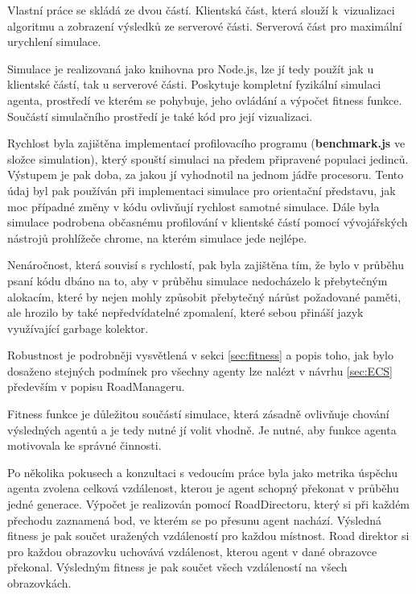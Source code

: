 



Vlastní práce se skládá ze dvou částí. Klientská část, která slouží k~vizualizaci algoritmu a zobrazení výsledků ze serverové části. Serverová část pro maximální urychlení simulace. 

Simulace je realizovaná jako knihovna pro Node.js, lze jí tedy použít jak u klientské částí, tak u serverové části. Poskytuje kompletní fyzikální simulaci agenta, prostředí ve kterém se pohybuje, jeho ovládání a výpočet fitness funkce. Součástí simulačního prostředí je také kód pro její vizualizaci.

Rychlost byla zajištěna implementací profilovacího programu (\textbf{benchmark.js} ve složce simulation), který spouští simulaci na předem připravené populaci jedinců. Výstupem je pak doba, za jakou jí vyhodnotil na jednom jádře procesoru. Tento údaj byl pak používán při implementaci simulace pro orientační představu, jak moc případné změny v kódu ovlivňují rychlost samotné simulace. Dále byla simulace podrobena občasnému profilování v klientské částí pomocí vývojářských nástrojů prohlížeče chrome, na kterém simulace jede nejlépe.

Nenáročnost, která souvisí s rychlostí, pak byla zajištěna tím, že bylo v průběhu psaní kódu dbáno na to, aby v průběhu simulace nedocházelo k přebytečným alokacím, které by nejen mohly způsobit přebytečný nárůst požadované paměti, ale hrozilo by také nepředvídatelné zpomalení, které sebou přináší jazyk využívající garbage kolektor.

Robustnost je podrobněji vysvětlená v sekci \ref{sec:fitness} a popis toho, jak bylo dosaženo stejných podmínek pro všechny agenty lze nalézt v návrhu \ref{sec:ECS} především v popisu RoadManageru.

\label{sec:fitness}
Fitness funkce je důležitou součástí simulace, která zásadně ovlivňuje chování výsledných agentů a je tedy nutné jí volit vhodně. Je nutné, aby funkce agenta motivovala ke správné činnosti.

Po několika pokusech a konzultaci s vedoucím práce byla jako metrika úspěchu agenta zvolena celková vzdálenost, kterou je agent schopný překonat v průběhu jedné generace. Výpočet je realizován pomocí RoadDirectoru, který si při každém přechodu zaznamená bod, ve kterém se po přesunu agent nachází. Výsledná fitness je pak součet uražených vzdáleností pro každou místnost. Road direktor si pro každou obrazovku uchovává vzdálenost, kterou agent v dané obrazovce překonal. Výsledným fitness je pak součet všech vzdáleností na všech obrazovkách.

